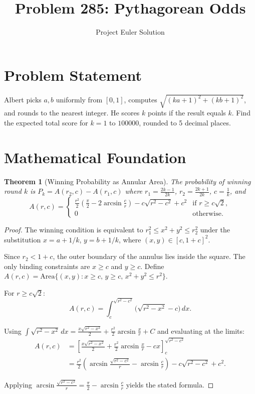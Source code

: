 \documentclass[12pt]{article}
\title{Problem 285: Pythagorean Odds}
\author{Project Euler Solution}
\date{}
\newtheorem{theorem}{Theorem}
\begin{document}
\maketitle

\section{Problem Statement}

Albert picks $a,b$ uniformly from $[0,1]$, computes $\sqrt{(ka+1)^2+(kb+1)^2}$, and rounds to the nearest integer. He scores $k$ points if the result equals $k$. Find the expected total score for $k = 1$ to $100000$, rounded to 5 decimal places.

\section{Mathematical Foundation}

\begin{theorem}[Winning Probability as Annular Area]
The probability of winning round $k$ is $P_k = A(r_2,c) - A(r_1,c)$ where $r_1 = \frac{2k-1}{2k}$, $r_2 = \frac{2k+1}{2k}$, $c = \frac{1}{k}$, and
\[
A(r,c) = \begin{cases}
\displaystyle\frac{r^2}{2}\!\left(\frac{\pi}{2} - 2\arcsin\frac{c}{r}\right) - c\sqrt{r^2-c^2} + c^2 & \text{if } r \ge c\sqrt{2}, \\[8pt]
0 & \text{otherwise}.
\end{cases}
\]
\end{theorem}

\begin{proof}
The winning condition is equivalent to $r_1^2 \le x^2+y^2 \le r_2^2$ under the substitution $x = a + 1/k$, $y = b + 1/k$, where $(x,y) \in [c, 1+c]^2$.

Since $r_2 < 1+c$, the outer boundary of the annulus lies inside the square. The only binding constraints are $x \ge c$ and $y \ge c$. Define $A(r,c) = \mathrm{Area}\{(x,y): x \ge c,\, y \ge c,\, x^2+y^2 \le r^2\}$.

For $r \ge c\sqrt{2}$:
\[
A(r,c) = \int_c^{\sqrt{r^2-c^2}} \bigl(\sqrt{r^2-x^2} - c\bigr)\,dx.
\]

Using $\int \sqrt{r^2-x^2}\,dx = \frac{x\sqrt{r^2-x^2}}{2} + \frac{r^2}{2}\arcsin\frac{x}{r} + C$ and evaluating at the limits:
\begin{align*}
A(r,c) &= \left[\frac{x\sqrt{r^2-x^2}}{2} + \frac{r^2}{2}\arcsin\frac{x}{r} - cx\right]_c^{\sqrt{r^2-c^2}} \\
&= \frac{r^2}{2}\!\left(\arcsin\frac{\sqrt{r^2-c^2}}{r} - \arcsin\frac{c}{r}\right) - c\sqrt{r^2-c^2} + c^2.
\end{align*}

Applying $\arcsin\frac{\sqrt{r^2-c^2}}{r} = \frac{\pi}{2} - \arcsin\frac{c}{r}$ yields the stated formula.
\end{proof}
\end{document}
